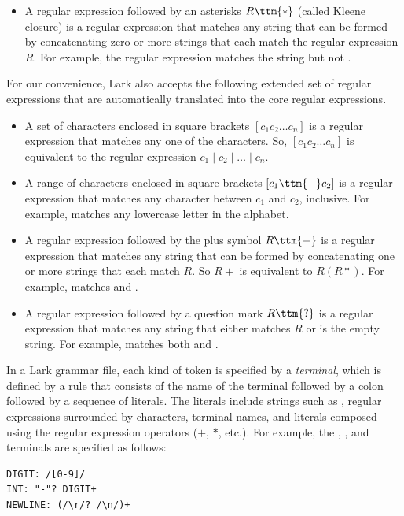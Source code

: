 \documentclass[7x10]{TimesAPriori_MIT}%
\numberwithin{theorem}{chapter}
\numberwithin{definition}{chapter}
\numberwithin{equation}{chapter}
\begin{document}
{\begin{itemize}
\item A regular expression followed by an asterisks $R\ttm{*}$ (called
  Kleene closure) is a regular expression that matches any string that
  can be formed by concatenating zero or more strings that each match
  the regular expression $R$.  For example, the regular expression
   matches the string  but not
  .
\end{itemize}

For our convenience, Lark also accepts the following extended set of
regular expressions that are automatically translated into the core
regular expressions.

\begin{itemize}
\item A set of characters enclosed in square brackets $[c_1 c_2 \ldots
  c_n]$ is a regular expression that matches any one of the
  characters. So, $[c_1 c_2 \ldots c_n]$  is equivalent to
  the regular expression $c_1\mid c_2\mid \ldots \mid c_n$.
\item A range of characters enclosed in square brackets $[c_1\ttm{-}c_2]$ is
  a regular expression that matches any character between $c_1$ and
  $c_2$, inclusive. For example, \code{[a-z]} matches any lowercase
  letter in the alphabet.
\item A regular expression followed by the plus symbol $R\ttm{+}$
  is a regular expression that matches any string that can
  be formed by concatenating one or more strings that each match $R$.
  So $R+$ is equivalent to $R(R*)$. For example, \code{[a-z]+}
  matches  and .
\item A regular expression followed by a question mark $R\ttm{?}$
  is a regular expression that matches any string that either
  matches $R$ or is the empty string.
  For example,   matches both  and .
\end{itemize}

In a Lark grammar file, each kind of token is specified by a
\emph{terminal}, which is defined by a rule
that consists of the name of the terminal followed by a colon followed
by a sequence of literals.  The literals include strings such as
, regular expressions surrounded by \code{/} characters,
terminal names, and literals composed using the regular expression
operators ($+$, $*$, etc.).  For example, the ,
, and  terminals are specified as follows:
\begin{center}
\begin{minipage}{0.95\textwidth}
\begin{lstlisting}
DIGIT: /[0-9]/
INT: "-"? DIGIT+
NEWLINE: (/\r/? /\n/)+
\end{lstlisting}
\end{minipage}
\end{center}


}
\end{document}
